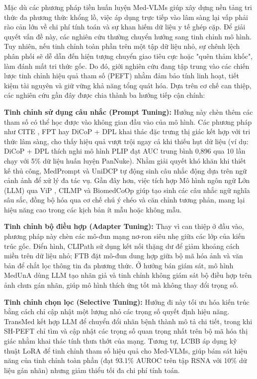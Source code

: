 \begin{refsection}
Mặc dù các phương pháp tiền huấn luyện Med-VLMs giúp xây dựng nền tảng tri thức đa phương thức khổng lồ, việc áp dụng trực tiếp vào lâm sàng lại vấp phải rào cản lớn về chi phí tính toán và sự khan hiếm dữ liệu y tế ghép cặp. Để giải quyết vấn đề này, các nghiên cứu thường chuyển hướng sang tinh chỉnh mô hình. Tuy nhiên, nếu tinh chỉnh toàn phần trên một tập dữ liệu nhỏ, sự chênh lệch phân phối sẽ dễ dẫn đến hiện tượng chuyển giao tiêu cực hoặc "quên thảm khốc", làm đánh mất tri thức gốc. Do đó, giới nghiên cứu đang tập trung vào các chiến lược tinh chỉnh hiệu quả tham số (PEFT) nhằm đảm bảo tính linh hoạt, tiết kiệm tài nguyên và giữ vững khả năng tổng quát hóa. Dựa trên cơ chế can thiệp, các nghiên cứu gần đây được chia thành ba hướng tiếp cận chính:

\pagebreak

\textbf{Tinh chỉnh sử dụng câu nhắc (Prompt Tuning):} Hướng này chèn thêm các tham số có thể học được vào không gian đầu vào của mô hình. Các phương pháp như CITE \cite{CITE}, FPT \cite{FPT} hay DiCoP + DPL \cite{PLIP} khai thác đặc trưng thị giác kết hợp với tri thức lâm sàng, cho thấy hiệu quả vượt trội ngay cả khi thiếu hụt dữ liệu (ví dụ: DiCoP + DPL thích nghi mô hình PLIP đạt AUC trung bình 0,896 qua 10 lần chạy với 5\% dữ liệu huấn luyện PanNuke). Nhằm giải quyết khó khăn khi thiết kế thủ công, MedPrompt \cite{MedPrompt} và UniDCP \cite{UniDCP} tự động sinh câu nhắc động dựa trên ngữ cảnh ảnh để xử lý đa tác vụ. Gần đây hơn, việc tích hợp Mô hình ngôn ngữ Lớn (LLM) qua ViP \cite{ViP}, CILMP \cite{CLIMP} và BiomedCoOp \cite{BiomedCoOp} giúp tạo sinh các câu nhắc ngữ nghĩa sâu sắc, đồng bộ hóa qua cơ chế chú ý chéo và căn chỉnh tương phản, mang lại hiệu năng cao trong các kịch bản ít mẫu hoặc không mẫu.

\textbf{Tinh chỉnh bộ điều hợp (Adapter Tuning):} Thay vì can thiệp ở đầu vào, phương pháp này chèn các mô-đun mạng nơ-ron siêu nhẹ giữa các lớp của kiến trúc gốc. Điển hình, CLIPath \cite{CLIPath} sử dụng kết nối thặng dư để giảm khoảng cách miền trên dữ liệu nhỏ; FTB \cite{FTB} đặt mô-đun dung hợp giữa bộ mã hóa ảnh và văn bản để chắt lọc thông tin đa phương thức. Ở hướng bán giám sát, mô hình MedUnA \cite{MedUnA} dùng LLM tạo nhãn giả và tinh chỉnh không giám sát bộ điều hợp trên ảnh chưa gán nhãn, giúp mô hình thích ứng tốt mà không thay đổi trọng số.

\textbf{Tinh chỉnh chọn lọc (Selective Tuning):} Hướng đi này tối ưu hóa kiến trúc bằng cách chỉ cập nhật một lượng nhỏ các trọng số quyết định hiệu năng. TransMed \cite{TransMed} kết hợp LLM để chuyển đổi nhãn bệnh thành mô tả chi tiết, trong khi SH-PEFT \cite{SH-PEFT} chỉ tìm và cập nhật các trọng số quan trọng nhất trên bộ mã hóa thị giác nhằm khai thác tính thưa thớt của mạng. Tương tự, LCBB \cite{LCBB} áp dụng kỹ thuật LoRA để tinh chỉnh tham số hiệu quả cho Med-VLMs, giúp bám sát hiệu năng của tinh chỉnh toàn phần (đạt 93.1\% AUROC trên tập RSNA với 10\% dữ liệu gán nhãn) nhưng giảm thiểu tối đa chi phí tính toán.


\end{refsection}
